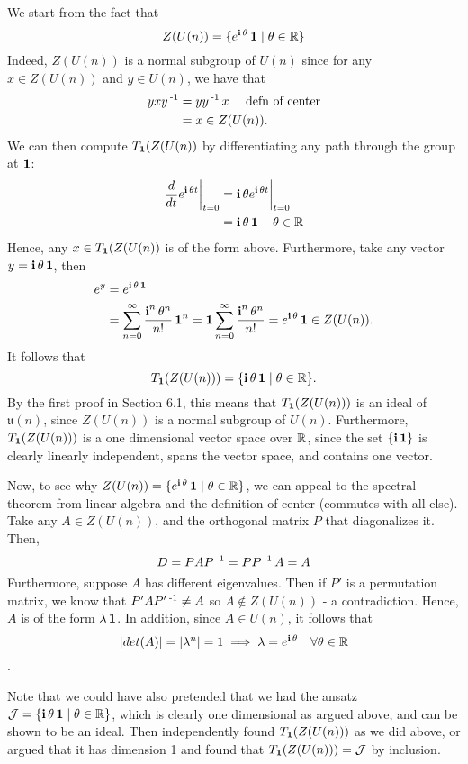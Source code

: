 \documentclass[12pt,onecolumn]{article}
\begin{document}
\begin{answer}
We start from the fact that 
$$ Z(U(n)) = \{ e^{\operatorname{\textbf{i}} \theta} \operatorname{\mathbf{1}} \mid \theta \in \operatorname{\mathbb{R}}\} $$
Indeed, $Z(U(n))$ is a normal subgroup of $U(n)$ since for any $x \in Z(U(n))$ and $y \in U(n)$, we have that
\begin{align*}
    yxy\operatorname{^{-1}} &= yy\operatorname{^{-1}} x \quad \text{ defn of center} \\
    &= x \in Z(U(n)).
\end{align*}
We can then compute $T_{\operatorname{\mathbf{1}}}(Z(U(n))$ by differentiating any path through the group at $\operatorname{\mathbf{1}}$:
\begin{align*}
    \frac{d}{dt} e^{\operatorname{\textbf{i}} \theta t}\bigg|_{t=0} &= \operatorname{\textbf{i}} \theta e^{\operatorname{\textbf{i}} \theta t}\bigg|_{t=0} \\
    &= \operatorname{\textbf{i}} \theta \operatorname{\mathbf{1}} \quad \theta \in \operatorname{\mathbb{R}}
\end{align*}
Hence, any $x \in T_{\operatorname{\mathbf{1}}}(Z(U(n))$ is of the form above. Furthermore, take any vector $ y = \operatorname{\textbf{i}} \theta \operatorname{\mathbf{1}}$, then
\begin{align*}
    e^y &= e^{\operatorname{\textbf{i}} \theta \operatorname{\mathbf{1}}} \\
    &= \sum_{n=0}^\infty \frac{\operatorname{\textbf{i}}^n \theta^n}{n!} \operatorname{\mathbf{1}}^n = \operatorname{\mathbf{1}}\sum_{n=0}^\infty \frac{\operatorname{\textbf{i}}^n \theta^n}{n!} = e^{\operatorname{\textbf{i}} \theta} \operatorname{\mathbf{1}} \in Z(U(n)).
\end{align*}
It follows that $$T_{\operatorname{\mathbf{1}}}(Z(U(n))) = \{\operatorname{\textbf{i}} \theta \operatorname{\mathbf{1}} \mid \theta \in \operatorname{\mathbb{R}}\}.$$
By the first proof in Section 6.1, this means that $T_{\operatorname{\mathbf{1}}}(Z(U(n)))$ is an ideal of $\mathfrak{u}(n)$, since $Z(U(n))$ is a normal subgroup of $U(n)$. Furthermore, $T_{\operatorname{\mathbf{1}}}(Z(U(n)))$ is a one dimensional vector space over $\operatorname{\mathbb{R}}$, since the set $\{\operatorname{\textbf{i}} \operatorname{\mathbf{1}} \}$ is clearly linearly independent, spans the vector space, and contains one vector.

Now, to see why $Z(U(n)) = \{ e^{\operatorname{\textbf{i}} \theta} \operatorname{\mathbf{1}} \mid \theta \in \operatorname{\mathbb{R}}\}$, we can appeal to the spectral theorem from linear algebra and the definition of center (commutes with all else). Take any $A \in Z(U(n))$, and the orthogonal matrix $P$ that diagonalizes it. Then,
$$  D = PAP\operatorname{^{-1}} = PP\operatorname{^{-1}} A = A $$
Furthermore, suppose $A$ has different eigenvalues. Then if $P'$ is a permutation matrix, we know that $P'AP'\operatorname{^{-1}} \neq A$ so $A \notin Z(U(n))$ - a contradiction. Hence, $A$ is of the form $\lambda \operatorname{\mathbf{1}}$. In addition, since $A \in U(n)$, it follows that $$|det(A)| = |\lambda^n| = 1 \implies \lambda = e^{\operatorname{\textbf{i}} \theta} \quad \forall\theta \in \operatorname{\mathbb{R}}$$.

Note that we could have also pretended that we had the ansatz $\mathcal{J} = \{ \operatorname{\textbf{i}} \theta \operatorname{\mathbf{1}} \mid \theta \in \operatorname{\mathbb{R}}\}$, which is clearly one dimensional as argued above, and can be shown to be an ideal. Then independently found $T_{\operatorname{\mathbf{1}}}(Z(U(n)))$ as we did above, or argued that it has dimension 1 and found that $T_{\operatorname{\mathbf{1}}}(Z(U(n))) = \mathcal{J}$ by inclusion.
\end{answer}
\end{document}
